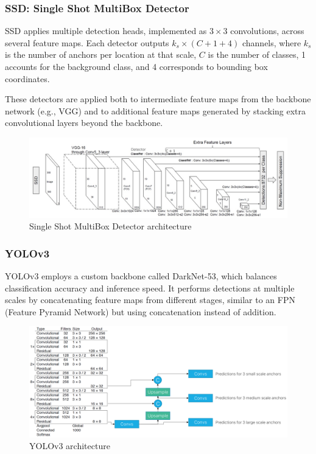 \subsubsection{SSD: Single Shot MultiBox Detector}

SSD applies multiple detection heads, implemented as $3 \times 3$ convolutions, across several feature maps. Each detector outputs $k_s \times (C + 1 + 4)$ channels, where $k_s$ is the number of anchors per location at that scale, $C$ is the number of classes, 1 accounts for the background class, and 4 corresponds to bounding box coordinates.

These detectors are applied both to intermediate feature maps from the backbone network (e.g., VGG) and to additional feature maps generated by stacking extra convolutional layers beyond the backbone.

\newpage
\begin{figure}[htbp]
  \centering
  \includegraphics[width=0.9\linewidth]{./img/ssd.jpg}
  \caption{Single Shot MultiBox Detector architecture}
\end{figure}

\subsubsection{YOLOv3}

YOLOv3 employs a custom backbone called DarkNet-53, which balances classification accuracy and inference speed. It performs detections at multiple scales by concatenating feature maps from different stages, similar to an FPN (Feature Pyramid Network) but using concatenation instead of addition.

\begin{figure}[htbp]
  \centering
  \includegraphics[width=0.9\linewidth]{./img/yolov3.png}
  \caption{YOLOv3 architecture}
\end{figure}

